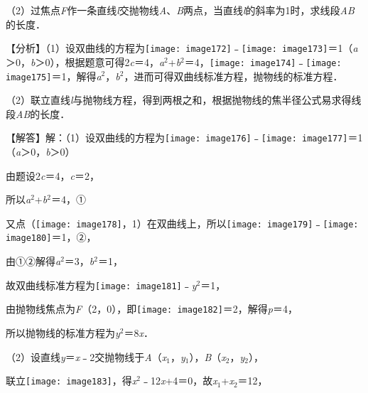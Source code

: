 \documentclass[a4paper,11pt,UTF8,twoside]{ctexart} %
\begin{document}
（2）过焦点\textit{F}作一条直线\textit{l}交抛物线\textit{A}、\textit{B}两点，当直线\textit{l}的斜率为1时，求线段\textit{AB}的长度．

【分析】（1）设双曲线的方程为\texttt{[image: image172]}﹣\texttt{[image: image173]}＝1（\textit{a}＞0，\textit{b}＞0），根据题意可得2\textit{c}＝4，\textit{a}${}^{2}$+\textit{b}${}^{2}$＝4，\texttt{[image: image174]}﹣\texttt{[image: image175]}＝1，解得\textit{a}${}^{2}$，\textit{b}${}^{2}$，进而可得双曲线标准方程，抛物线的标准方程．

（2）联立直线\textit{l}与抛物线方程，得到两根之和，根据抛物线的焦半径公式易求得线段\textit{AB}的长度．

【解答】解：（1）设双曲线的方程为\texttt{[image: image176]}﹣\texttt{[image: image177]}＝1（\textit{a}＞0，\textit{b}＞0）

由题设2\textit{c}＝4，\textit{c}＝2，

所以\textit{a}${}^{2}$+\textit{b}${}^{2}$＝4，①

又点（\texttt{[image: image178]}，1）在双曲线上，所以\texttt{[image: image179]}﹣\texttt{[image: image180]}＝1，②，

由①②解得\textit{a}${}^{2}$＝3，\textit{b}${}^{2}$＝1，

故双曲线标准方程为\texttt{[image: image181]}﹣\textit{y}${}^{2}$＝1，

由抛物线焦点为\textit{F}（2，0），即\texttt{[image: image182]}＝2，解得\textit{p}＝4，

所以抛物线的标准方程为\textit{y}${}^{2}$＝8\textit{x}．

（2）设直线\textit{y}＝\textit{x}﹣2交抛物线于\textit{A}（\textit{x}${}_{1}$，\textit{y}${}_{1}$），\textit{B}（\textit{x}${}_{2}$，\textit{y}${}_{2}$），

联立\texttt{[image: image183]}，得\textit{x}${}^{2}$﹣12\textit{x}+4＝0，故\textit{x}${}_{1}$+\textit{x}${}_{2}$＝12，
\end{document}
